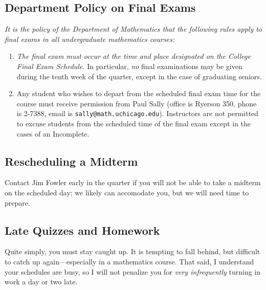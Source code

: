 \documentclass[12pt,letterpaper]{article}
\begin{document}
\subsection*{Department Policy on Final Exams}

\textit{It is the policy of the Department of Mathematics that the
following rules apply to final exams in all undergraduate mathematics
courses:}
\begin{enumerate}
\item \textit{The final exam must occur at the time and place designated on
the College Final Exam Schedule.}  In particular, \textit{no} final examinations
may be given during the tenth week of the quarter, except in the case
of graduating seniors.
\item Any student who wishes to depart from the scheduled final exam
time for the course must receive permission from Paul Sally (office is
Ryerson 350, phone is 2-7388, email is
\texttt{sally@math.uchicago.edu}).  Instructors are not permitted to
excuse students from the scheduled time of the final exam except in
the cases of an Incomplete.
\end{enumerate}

\subsection*{Rescheduling a Midterm}

Contact Jim Fowler early in the quarter if you will not be able to
take a midterm on the scheduled day; we likely can accomodate you, but
we will need time to prepare.

\subsection*{Late Quizzes and Homework}

Quite simply, you must stay caught up.  It is tempting to fall behind,
but difficult to catch up again---especially in a mathematics course.
That said, I understand your schedules are busy, so I will not
penalize you for \textit{very infrequently} turning in work a day or
two late.
\end{document}

